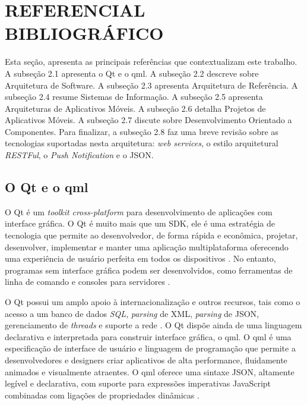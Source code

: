 \section{REFERENCIAL BIBLIOGRÁFICO}
Esta seção, apresenta as principais referências que contextualizam este trabalho. A subseção 2.1 apresenta o Qt e o qml. A subseção 2.2 descreve sobre Arquitetura de Software. A subseção 2.3 apresenta Arquitetura de Referência. A subseção 2.4 resume Sistemas de Informação. A subseção 2.5 apresenta Arquiteturas de Aplicativos Móveis. A subseção 2.6 detalha Projetos de Aplicativos Móveis. A subseção 2.7 discute sobre Desenvolvimento Orientado a Componentes. Para finalizar, a subseção 2.8 faz uma breve revisão sobre as tecnologias suportadas nesta arquitetura: \textit{web services}, o estilo arquitetural \textit{RESTFul}, o \textit{Push Notification} e o JSON.


\subsection{O Qt e o qml}
O Qt é um \textit{toolkit} \textit{cross-platform} para desenvolvimento de aplicações com interface gráfica. O Qt é muito mais que  um SDK, ele é uma estratégia de tecnologia que permite ao desenvolvedor, de forma rápida e econômica, projetar, desenvolver, implementar e manter uma aplicação multiplataforma oferecendo uma experiência de usuário perfeita em todos os dispositivos \cite{qt_io}. No entanto, programas sem interface gráfica podem ser desenvolvidos, como ferramentas de linha de comando e consoles para servidores \cite{qt_software}.\par
O Qt possui um amplo apoio à internacionalização e outros recursos, tais como o acesso a um banco de dados \textit{SQL}, \textit{parsing} de XML, \textit{parsing} de JSON, gerenciamento de \textit{threads} e suporte a rede \cite{qt_gui_toolkit}. O Qt dispõe ainda de uma linguagem declarativa e interpretada para construir interface gráfica, o qml. O qml é uma especificação de interface de usuário e linguagem de programação que permite a desenvolvedores e designers criar aplicativos de alta performance, fluidamente animados e visualmente atraentes. O qml oferece uma sintaxe JSON, altamente legível e declarativa, com suporte para expressões imperativas JavaScript combinadas com ligações de propriedades dinâmicas \cite{doc_qt_io}.


